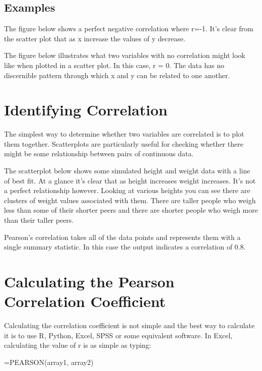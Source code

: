 \documentclass[
]{book}
\begin{document}
\hypertarget{examples}{%
\subsection{Examples}\label{examples}}

The figure below shows a perfect negative correlation where r=-1. It's clear from the scatter plot that as x increase the values of y decrease.

The figure below illustrates what two variables with no correlation might look like when plotted in a scatter plot. In this case, r = 0. The data has no discernible pattern through which x and y can be related to one another.

\hypertarget{identifying-correlation}{%
\section{Identifying Correlation}\label{identifying-correlation}}

The simplest way to determine whether two variables are correlated is to plot them together. Scatterplots are particularly useful for checking whether there might be some relationship between pairs of continuous data.

The scatterplot below shows some simulated height and weight data with a line of best fit. At a glance it's clear that as height increases weight increases. It's not a perfect relationship however. Looking at various heights you can see there are clusters of weight values associated with them. There are taller people who weigh less than some of their shorter peers and there are shorter people who weigh more than their taller peers.

Pearson's correlation takes all of the data points and represents them with a single summary statistic. In this case the output indicates a correlation of 0.8.

\hypertarget{calculating-the-pearson-correlation-coefficient}{%
\section{Calculating the Pearson Correlation Coefficient}\label{calculating-the-pearson-correlation-coefficient}}

Calculating the correlation coefficient is not simple and the best way to calculate it is to use R, Python, Excel, SPSS or some equivalent software. In Excel, calculating the value of r is as simple as typing:

=PEARSON(array1, array2)
\end{document}
